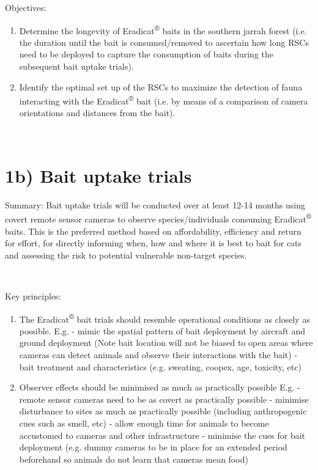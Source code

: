 \documentclass[version=last,
    paper=a4,                               %
    10pt,                                   %
    dvipsnames,
    oneside,                              %
    headings=openany,                       %
    open=any,
    BCOR=7mm,                               %
    DIV=15,     %
]{scrbook}
\begin{document}
Objectives:

\begin{enumerate}
\itemsep1pt\parskip0pt
\item
  Determine the longevity of Eradicat\textsuperscript{®} baits in the
  southern jarrah forest (i.e. the duration until the bait is
  consumed/removed to ascertain how long RSCs need to be deployed to
  capture the consumption of baits during the subsequent bait uptake
  trials).
\item
  Identify the optimal set up of the RSCs to maximize the detection of
  fauna interacting with the Eradicat\textsuperscript{®} bait (i.e. by
  means of a comparison of camera orientations and distances from the
  bait).
\end{enumerate}

~

\section{1b) Bait uptake trials}

Summary: Bait uptake trials will be conducted over at least 12-14 months
using covert remote sensor cameras to observe species/individuals
consuming Eradicat\textsuperscript{®} baits. This is the preferred
method based on affordability, efficiency and return for effort, for
directly informing when, how and where it is best to bait for cats and
assessing the risk to potential vulnerable non-target species.

~

Key principles:

\begin{enumerate}
\itemsep1pt\parskip0pt
\item
  The Eradicat\textsuperscript{®} bait trials should resemble
  operational conditions as closely as possible. E.g. - mimic the
  spatial pattern of bait deployment by aircraft and ground deployment
  (Note bait location will not be biased to open areas where cameras can
  detect animals and observe their interactions with the bait) - bait
  treatment and characteristics (e.g. sweating, coopex, age, toxicity,
  etc)
\item
  Observer effects should be minimised as much as practically possible
  E.g. - remote sensor cameras need to be as covert as practically
  possible - minimise disturbance to sites as much as practically
  possible (including anthropogenic cues such as smell, etc) - allow
  enough time for animals to become accustomed to cameras and other
  infrastructure - minimise the cues for bait deployment (e.g. dummy
  cameras to be in place for an extended period beforehand so animals do
  not learn that cameras mean food)
\end{enumerate}
\end{document}
